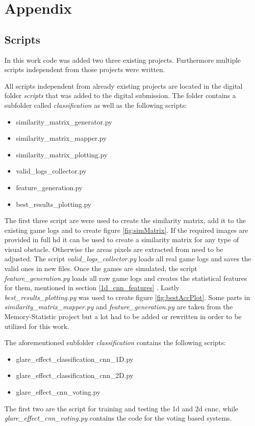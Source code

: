 \appendix

\chapter{Appendix}

\section{Scripts}
In this work code was added two three existing projects. Furthermore multiple scripts independent from those projects were written. 

All scripts independent from already existing projects are located in the digital folder \textit{scripts} that was added to the digital submission. The folder contains a subfolder called \textit{classification} as well as the following scripts: 
\begin{itemize}
	\item similarity\_matrix\_generator.py
	\item similarity\_matrix\_mapper.py
	\item similarity\_matrix\_plotting.py
	\item valid\_logs\_collector.py
	\item feature\_generation.py
	\item best\_results\_plotting.py
\end{itemize}
The first three script are were used to create the similarity matrix, add it to the existing game logs and to create figure \ref{fig:simMatrix}. If the required images are provided in full hd it can be used to create a similarity matrix for any type of visual obstacle. Otherwise the areas pixels are extracted from need to be adjusted. The script \textit{valid\_logs\_collector.py} loads all real game logs and saves the valid ones in new files. Once the games are simulated, the script \textit{feature\_generation.py} loads all raw game logs and creates the statistical features for them, mentioned in section \ref{1d_cnn_features} . Lastly \textit{best\_results\_plotting.py} was used to create figure \ref{fig:bestAccPlot}. Some parts in \textit{similarity\_matrix\_mapper.py} and \textit{feature\_generation.py} are taken from the Memory-Statistic project but a lot had to be added or rewritten in order to be utilized for this work.

\newpage

The aforementioned subfolder \textit{classification} contains the following scripts: 
\begin{itemize}
	\item glare\_effect\_classification\_cnn\_1D.py
	\item glare\_effect\_classification\_cnn\_2D.py
	\item glare\_effect\_cnn\_voting.py
\end{itemize}
The first two are the script for training and testing the 1d and 2d cnnc, while \textit{glare\_effect\_cnn\_voting.py} contains the code for the voting based systems. 

